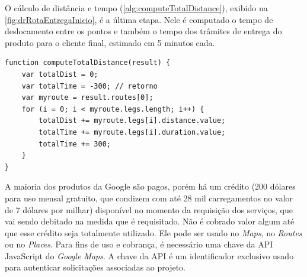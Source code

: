 O cálculo de distância e tempo (\autoref{alg:computeTotalDistance}), exibido na \autoref{fig:drRotaEntregaInicio}, é a última etapa. Nele é computado o tempo de deslocamento entre os pontos e também o tempo dos trâmites de entrega do produto para o cliente final, estimado em 5 minutos cada.

\begin{lstlisting}[caption={Delivery Routes - Função de cálculo do deslocamento}, style=htmlcssjs, label=alg:computeTotalDistance]
function computeTotalDistance(result) {
    var totalDist = 0;
    var totalTime = -300; // retorno
    var myroute = result.routes[0];
    for (i = 0; i < myroute.legs.length; i++) {
        totalDist += myroute.legs[i].distance.value;
        totalTime += myroute.legs[i].duration.value;
        totalTime += 300;
    }
}
\end{lstlisting}

A maioria dos produtos da Google são pagos, porém há um crédito (200 dólares para uso mensal gratuito, que condizem com até 28 mil carregamentos no valor de 7 dólares por milhar) disponível no momento da requisição dos serviços, que vai sendo debitado na medida que é requisitado. Não é cobrado valor algum até que esse crédito seja totalmente utilizado. Ele pode ser usado no \textit{Maps}, no \textit{Routes} ou no \textit{Places}. Para fins de uso e cobrança, é necessário uma chave da API JavaScript do \textit{Google Maps}. A chave da API é um identificador exclusivo usado para autenticar solicitações associadas ao projeto.